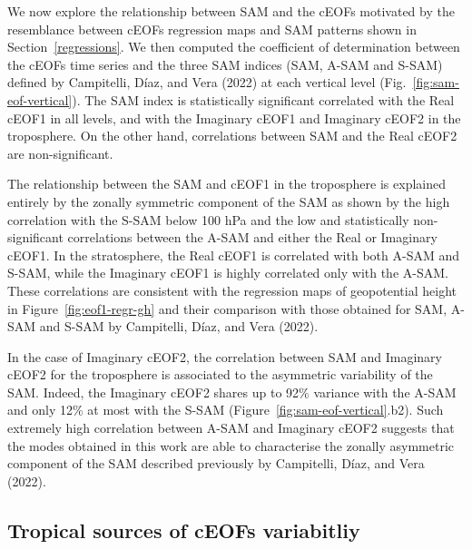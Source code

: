 \documentclass[smallextended]{svjour3}       %
\begin{document}
We now explore the relationship between SAM and the cEOFs motivated by the resemblance between cEOFs regression maps and SAM patterns shown in Section~\ref{regressions}.
We then computed the coefficient of determination between the cEOFs time series and the three SAM indices (SAM, A-SAM and S-SAM) defined by Campitelli, Díaz, and Vera (2022) at each vertical level (Fig.~\ref{fig:sam-eof-vertical}).
The SAM index is statistically significant correlated with the Real cEOF1 in all levels, and with the Imaginary cEOF1 and Imaginary cEOF2 in the troposphere.
On the other hand, correlations between SAM and the Real cEOF2 are non-significant.

The relationship between the SAM and cEOF1 in the troposphere is explained entirely by the zonally symmetric component of the SAM as shown by the high correlation with the S-SAM below 100 hPa and the low and statistically non-significant correlations between the A-SAM and either the Real or Imaginary cEOF1.
In the stratosphere, the Real cEOF1 is correlated with both A-SAM and S-SAM, while the Imaginary cEOF1 is highly correlated only with the A-SAM.
These correlations are consistent with the regression maps of geopotential height in Figure~\ref{fig:eof1-regr-gh} and their comparison with those obtained for SAM, A-SAM and S-SAM by Campitelli, Díaz, and Vera (2022).

In the case of Imaginary cEOF2, the correlation between SAM and Imaginary cEOF2 for the troposphere is associated to the asymmetric variability of the SAM.
Indeed, the Imaginary cEOF2 shares up to 92\% variance with the A-SAM and only 12\% at most with the S-SAM (Figure~\ref{fig:sam-eof-vertical}.b2).
Such extremely high correlation between A-SAM and Imaginary cEOF2 suggests that the modes obtained in this work are able to characterise the zonally asymmetric component of the SAM described previously by Campitelli, Díaz, and Vera (2022).

\hypertarget{tropical}{%
\subsection{Tropical sources of cEOFs variabitliy}\label{tropical}}
\end{document}
